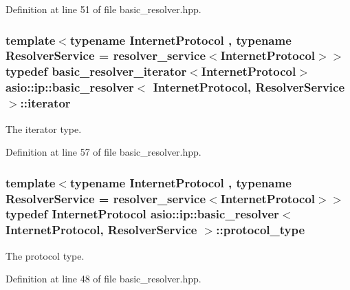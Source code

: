 Definition at line 51 of file basic\+\_\+resolver.\+hpp.

\hypertarget{classasio_1_1ip_1_1basic__resolver_ad1cc50a31ba4971329a34eb01ef5a21c}{}
\subsubsection[{iterator}]{\setlength{\rightskip}{0pt plus 5cm}template$<$typename Internet\+Protocol , typename Resolver\+Service  = resolver\+\_\+service$<$\+Internet\+Protocol$>$$>$ typedef {\bf basic\+\_\+resolver\+\_\+iterator}$<$Internet\+Protocol$>$ {\bf asio\+::ip\+::basic\+\_\+resolver}$<$ Internet\+Protocol, Resolver\+Service $>$\+::{\bf iterator}}\label{classasio_1_1ip_1_1basic__resolver_ad1cc50a31ba4971329a34eb01ef5a21c}


The iterator type. 



Definition at line 57 of file basic\+\_\+resolver.\+hpp.

\hypertarget{classasio_1_1ip_1_1basic__resolver_aaf9eccf1df12895a55263a2fc3ea7d8c}{}
\subsubsection[{protocol\+\_\+type}]{\setlength{\rightskip}{0pt plus 5cm}template$<$typename Internet\+Protocol , typename Resolver\+Service  = resolver\+\_\+service$<$\+Internet\+Protocol$>$$>$ typedef Internet\+Protocol {\bf asio\+::ip\+::basic\+\_\+resolver}$<$ Internet\+Protocol, Resolver\+Service $>$\+::{\bf protocol\+\_\+type}}\label{classasio_1_1ip_1_1basic__resolver_aaf9eccf1df12895a55263a2fc3ea7d8c}


The protocol type. 



Definition at line 48 of file basic\+\_\+resolver.\+hpp.

\hypertarget{classasio_1_1ip_1_1basic__resolver_ac842e1f99be7849517bcd365fecb423c}{}

